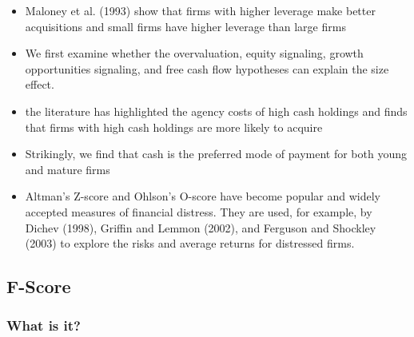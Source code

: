 \documentclass[12pt]{article}
\begin{document}
\begin{itemize}
            \item Maloney et al. (1993) show that firms with higher leverage make better acquisitions and small firms have higher leverage than large firms \citep{Moeller2004}

            \item We first examine whether the overvaluation, equity signaling, growth opportunities signaling, and free cash flow hypotheses can explain the size effect. \citep{Moeller2004}

            \item the literature has highlighted the agency costs of high cash holdings and finds that firms with high cash holdings are more likely to acquire \citep{Arikan2016}

            \item Strikingly, we find that cash is the preferred mode of payment for both young and mature firms \citep{Arikan2016}

            \item Altman’s Z-score and Ohlson’s O-score have become popular and widely accepted measures of financial distress. They are used, for example, by Dichev (1998), Griffin and Lemmon (2002), and Ferguson and Shockley (2003) to explore the risks and average returns for distressed firms. \citep{Campbell2008}
        \end{itemize}

\subsection{F-Score}

    \subsubsection{What is it?}
\end{document}
